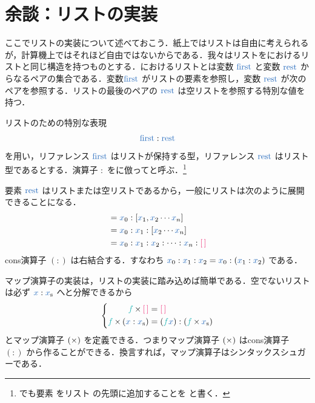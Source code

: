 \documentclass[a5paper,twoside,fleqn,draft]{jsbook}
\begin{document}
\section{余談：リストの実装}

ここでリストの実装について述べておこう．紙上ではリストは自由に考えられるが，計算機上ではそれほど自由ではないからである．我々はリストを\lisp におけるリストと同じ構造を持つものとする．\lisp におけるリストとは変数 $\mFirstVar$ と変数 $\mRestVar$ からなるペアの集合である．変数$\mFirstVar$ がリストの要素を参照し，変数 $\mRestVar$ が次のペアを参照する．リストの最後のペアの $\mRestVar$ は空リストを参照する特別な値を持つ．

リストのための特別な表現
\begin{equation}
  \mFirstVar:\mRestVar
\end{equation}
を用い，リファレンス $\mFirstVar$ はリストが保持する型，リファレンス $\mRestVar$ はリスト型であるとする．演算子 $:$ を\lisp に倣ってと呼ぶ．\footnote{\haskell でも要素  をリスト  の先頭に追加することを  と書く．}

要素 $\mRestVar$ はリストまたは空リストであるから，一般にリストは次のように展開できることになる．
\begin{align}
  [\hVar{x}_0,\hVar{x}_1,\hVar{x}_2\dotsb \hVar{x}_n]
  &=\hVar{x}_0:[\hVar{x}_1,\hVar{x}_2\dotsb \hVar{x}_n]\\
  &=\hVar{x}_0:\hVar{x}_1:[\hVar{x}_2\dotsb \hVar{x}_n]\\
  &=\hVar{x}_0:\hVar{x}_1:\hVar{x}_2:\dotsb:\hVar{x}_n:{\hEmptyList}
\end{align}
cons演算子 $(:)$ は右結合する．すなわち $\hVar{x}_0:\hVar{x}_1:\hVar{x}_2=\hVar{x}_0:(\hVar{x}_1:\hVar{x}_2)$ である．

マップ演算子の実装は，リストの実装に踏み込めば簡単である．空でないリストは必ず $\hVar{x}:\hListVar{x}$ へと分解できるから
\begin{equation}
  \left\{
  \begin{aligned}
    \hFunc{f}\hMap{\hEmptyList}
    &={\hEmptyList}\\
    \hFunc{f}\hMap{}(\hVar{x}:\hListVar{x})
    &=(\hFunc{f}\hVar{x}):(\hFunc{f}\hMap\hListVar{x})
  \end{aligned}
  \right.
\end{equation}
とマップ演算子 $(\operatorname{\times})$ を定義できる．つまりマップ演算子 $(\operatorname{\times})$ はcons演算子 $(:)$ から作ることができる．換言すれば，マップ演算子はシンタックスシュガーである．
\end{document}
